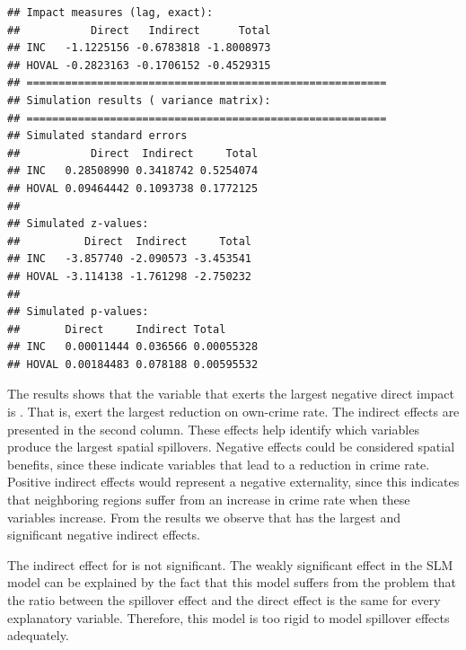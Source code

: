 \begin{knitrout}
\color{fgcolor}\begin{kframe}
\begin{alltt}
 \hlkwb{<-}     \hlstd{=} \hlstd{)}
  \hlstd{=} \hlstd{,}  \hlstd{=} \hlstd{)}
\end{alltt}
\begin{verbatim}
## Impact measures (lag, exact):
##           Direct   Indirect      Total
## INC   -1.1225156 -0.6783818 -1.8008973
## HOVAL -0.2823163 -0.1706152 -0.4529315
## ========================================================
## Simulation results ( variance matrix):
## ========================================================
## Simulated standard errors
##           Direct  Indirect     Total
## INC   0.28508990 0.3418742 0.5254074
## HOVAL 0.09464442 0.1093738 0.1772125
## 
## Simulated z-values:
##          Direct  Indirect     Total
## INC   -3.857740 -2.090573 -3.453541
## HOVAL -3.114138 -1.761298 -2.750232
## 
## Simulated p-values:
##       Direct     Indirect Total     
## INC   0.00011444 0.036566 0.00055328
## HOVAL 0.00184483 0.078188 0.00595532
\end{verbatim}
\end{kframe}
\end{knitrout}

The results shows that the variable that exerts the largest negative direct impact is . That is,  exert the largest reduction on own-crime rate. The indirect effects are presented in the second column. These effects help identify which variables produce the largest spatial spillovers. Negative effects could be considered spatial benefits, since these indicate variables that lead to a reduction in crime rate. Positive indirect effects would represent a negative externality, since this indicates that neighboring regions suffer from an increase in crime rate when these variables increase. From the results we observe that  has the largest and significant negative indirect effects. 

The indirect effect for  is not significant. The weakly significant effect in the SLM model can be explained by the fact that this model suffers from the problem that the ratio between the spillover effect and the direct effect is the same for every explanatory variable. Therefore, this model is too rigid to model spillover effects adequately. 

